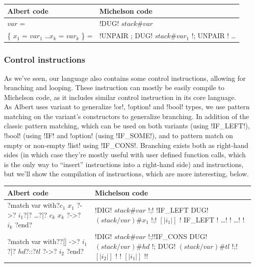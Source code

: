 \documentclass{report}
\begin{document}
{\small
\begin{longtable}{l|l}
  Albert code & Michelson code\\
  \hline
  $var$ = & !DUG! $stack\#var$\\
  \hline
  \{ $x_1$ = $var_1$ \ldots $x_k$ = $var_k$ \} = & !UNPAIR ; DUG! $stack\#var_1$ !; UNPAIR ! \ldots \\
\end{longtable}
}

\subsubsection{Control instructions}

As we've seen, our language also contains some control instructions, allowing for branching and looping. These instruction can mostly be easily compile to Michelson code, as it includes similar control instruction in its core language.\\

As Albert uses variant to generalize !or!, !option! and !bool! types, we use pattern matching on the variant's constructors to generalize branching. In addition of the classic pattern matching, which can be used on both variants (using !IF_LEFT!), !bool! (using !IF! and !option! (using !IF_SOME!), and to pattern match on empty or non-empty !list! using !IF_CONS!. Branching exists both as right-hand sides (in which case they're mostly useful with user defined function calls, which is the only way to ``insert'' instructions into a right-hand side) and instructions, but we'll show the compilation of instructions, which are more interesting, below.

{\small
\begin{longtable}{p{4cm}|p{11cm}}
  Albert code & Michelson code\\
  \hline
  ?match var with?\newline$c_1$ $x_1$ ?->? $i_1$?|? \ldots\newline?|? $c_k$ $x_k$ ?->? $i_k$ ?end? &
  !DIG! $stack\#var$ !;!\newline
  !IF_LEFT { DUG! $(stack/var)\#x_1$ !;! $[|i_1|]$ !} { IF_LEFT {! \ldots !} {! \ldots !} }!\\
  \hline
  ?match var with?\newline?[] ->? $i_1$\newline?|? $hd$?::?$tl$ ?->? $i_2$ ?end? &
  !DIG! $stack\#var$ !;!\newline !IF_CONS { DUG! $(stack/var)\#hd$ !; DUG! $(stack/var)\#tl$ !;! $[|i_2|]$ !} {! $[|i_1|]$ !}!
\end{longtable}
}
\end{document}
